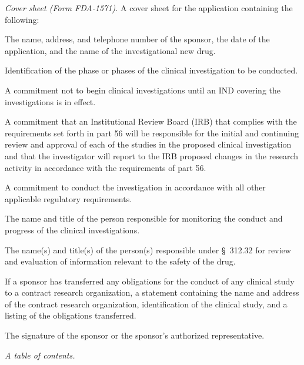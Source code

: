 \documentclass[11pt]{article}
\begin{document}
\begin{description}[leftmargin=0.5cm,style=sameline]
\item[(1)] \textit{Cover sheet (Form FDA-1571).} A cover sheet for the application containing the following:
\begin{description}[leftmargin=0.8cm,style=sameline]
\item[(i)] The name, address, and telephone number of the sponsor, the date of the application, and the name of the investigational new drug.
\item[(ii)] Identification of the phase or phases of the clinical investigation to be conducted.
\item[(iii)] A commitment not to begin clinical investigations until an IND covering the investigations is in effect.
\item[(iv)] A commitment that an Institutional Review Board (IRB) that complies with the requirements set forth in part 56 will be responsible for the initial and continuing review and approval of each of the studies in the proposed clinical investigation and that the investigator will report to the IRB proposed changes in the research activity in accordance with the requirements of part 56.
\item[(v)] A commitment to conduct the investigation in accordance with all other applicable regulatory requirements.
\item[(vi)] The name and title of the person responsible for monitoring the conduct and progress of the clinical investigations.
\item[(vii)] The name(s) and title(s) of the person(s) responsible under \S~312.32 for review and evaluation of information relevant to the safety of the drug.
\item[(viii)] If a sponsor has transferred any obligations for the conduct of any clinical study to a contract research organization, a statement containing the name and address of the contract research organization, identification of the clinical study, and a listing of the obligations transferred.
\item[(ix)] The signature of the sponsor or the sponsor's authorized representative.
\end{description}

\item[(2)] \textit{A table of contents.}


\end{description}
\end{document}
